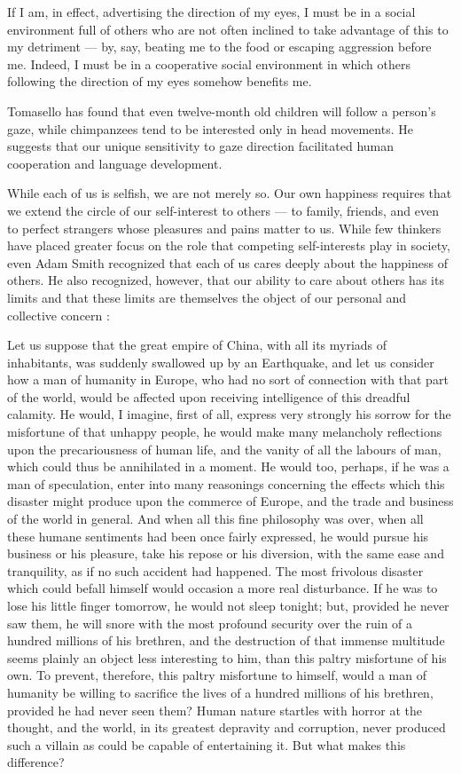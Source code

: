 \documentclass[a4paper,14pt]{extarticle}
\begin{document}
If I am, in effect, advertising the direction of my eyes, I must be in a social environment full of others who are not often inclined to take advantage of this to my detriment --- by, say, beating me to the food or escaping aggression before me.
Indeed, I must be in a cooperative social environment in which others following the direction of my eyes somehow benefits me.

Tomasello has found that even twelve-month old children will follow a person's gaze, while chimpanzees tend to be interested only in head movements.
He suggests that our unique sensitivity to gaze direction facilitated human cooperation and language development.

While each of us is selfish, we are not merely so.
Our own happiness requires that we extend the circle of our self-interest to others --- to family, friends, and even to perfect strangers whose pleasures and pains matter to us.
While few thinkers have placed greater focus on the role that competing self-interests play in society, even Adam Smith recognized that each of us cares deeply about the happiness of others.
He also recognized, however, that our ability to care about others has its limits and that these limits are themselves the object of our personal and collective concern :

Let us suppose that the great empire of China, with all its myriads of inhabitants, was suddenly swallowed up by an Earthquake, and let us consider how a man of humanity in Europe, who had no sort of connection with that part of the world, would be affected upon receiving intelligence of this dreadful calamity.
He would, I imagine, first of all, express very strongly his sorrow for the misfortune of that unhappy people, he would make many melancholy reflections upon the precariousness of human life, and the vanity of all the labours of man, which could thus be annihilated in a moment.
He would too, perhaps, if he was a man of speculation, enter into many reasonings concerning the effects which this disaster might produce upon the commerce of Europe, and the trade and business of the world in general.
And when all this fine philosophy was over, when all these humane sentiments had been once fairly expressed, he would pursue his business or his pleasure, take his repose or his diversion, with the same ease and tranquility, as if no such accident had happened.
The most frivolous disaster which could befall himself would occasion a more real disturbance.
If he was to lose his little finger tomorrow, he would not sleep tonight;
but, provided he never saw them, he will snore with the most profound security over the ruin of a hundred millions of his brethren, and the destruction of that immense multitude seems plainly an object less interesting to him, than this paltry misfortune of his own.
To prevent, therefore, this paltry misfortune to himself, would a man of humanity be willing to sacrifice the lives of a hundred millions of his brethren, provided he had never seen them?
Human nature startles with horror at the thought, and the world, in its greatest depravity and corruption, never produced such a villain as could be capable of entertaining it.
But what makes this difference?
\end{document}
